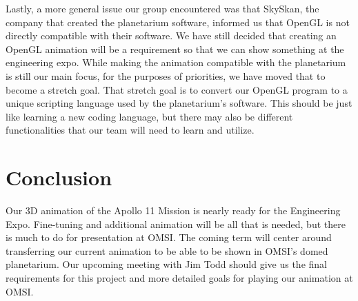 \documentclass[onecolumn, draftclsnofoot,10pt, compsoc]{IEEEtran}
\begin{document}
Lastly, a more general issue our group encountered was that SkySkan, the company that created the planetarium software, informed us that OpenGL is not directly compatible with their software. We have still decided that creating an OpenGL animation will be a requirement so that we can show something at the engineering expo. While making the animation compatible with the planetarium is still our main focus, for the purposes of priorities, we have moved that to become a stretch goal. That stretch goal is to convert our OpenGL program to a unique scripting language used by the planetarium's software. This should be just like learning a new coding language, but there may also be different functionalities that our team will need to learn and utilize. 

\section{Conclusion}

Our 3D animation of the Apollo 11 Mission is nearly ready for the Engineering Expo. Fine-tuning and additional animation will be all that is needed, but there is much to do for presentation at OMSI. The coming term will center around transferring our current animation to be able to be shown in OMSI's domed planetarium. Our upcoming meeting with Jim Todd should give us the final requirements for this project and more detailed goals for playing our animation at OMSI. 
\end{document}
